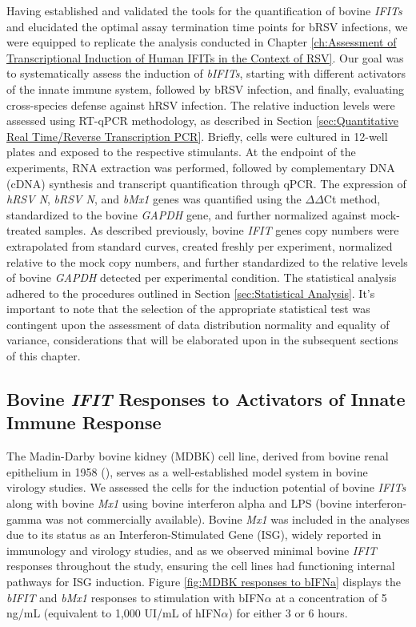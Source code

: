 Having established and validated the tools for the quantification of bovine \textit{IFITs} and elucidated the optimal assay termination time points for bRSV infections, we were equipped to replicate the analysis conducted in Chapter \ref{ch:Assessment of Transcriptional Induction of Human IFITs in the Context of RSV}. Our goal was to systematically assess the induction of \textit{bIFITs}, starting with different activators of the innate immune system, followed by bRSV infection, and finally, evaluating cross-species defense against hRSV infection. The relative induction levels were assessed using RT-qPCR methodology, as described in Section \ref{sec:Quantitative Real Time/Reverse Transcription PCR}. Briefly, cells were cultured in 12-well plates and exposed to the respective stimulants. At the endpoint of the experiments, RNA extraction was performed, followed by complementary DNA (cDNA) synthesis and transcript quantification through qPCR. The expression of \textit{hRSV N}, \textit{bRSV N}, and \textit{bMx1} genes was quantified using the \(\Delta\)\(\Delta\)Ct method, standardized to the bovine \textit{GAPDH} gene, and further normalized against mock-treated samples. As described previously, bovine \textit{IFIT} genes copy numbers were extrapolated from standard curves, created freshly per experiment, normalized relative to the mock copy numbers, and further standardized to the relative levels of bovine \textit{GAPDH} detected per experimental condition. The statistical analysis adhered to the procedures outlined in Section \ref{sec:Statistical Analysis}. It's important to note that the selection of the appropriate statistical test was contingent upon the assessment of data distribution normality and equality of variance, considerations that will be elaborated upon in the subsequent sections of this chapter.

\subsection{Bovine \textit{IFIT} Responses to Activators of Innate Immune Response} \label{subsec:Bovine IFIT Responses to Activators of Innate Immune Response}
The Madin-Darby bovine kidney (MDBK) cell line, derived from bovine renal epithelium in 1958 (\cite{Madin1958EstablishedOrigin}), serves as a well-established model system in bovine virology studies. We assessed the cells for the induction potential of bovine \textit{IFITs} along with bovine \textit{Mx1} using bovine interferon alpha and LPS (bovine interferon-gamma was not commercially available). Bovine \textit{Mx1} was included in the analyses due to its status as an Interferon-Stimulated Gene (ISG), widely reported in immunology and virology studies, and as we observed minimal bovine \textit{IFIT} responses throughout the study, ensuring the cell lines had functioning internal pathways for ISG induction. Figure \ref{fig:MDBK responses to bIFNa} displays the \textit{bIFIT} and \textit{bMx1} responses to stimulation with bIFN\(\alpha\) at a concentration of 5 ng/mL (equivalent to 1,000 UI/mL of hIFN\(\alpha\)) for either 3 or 6 hours.

